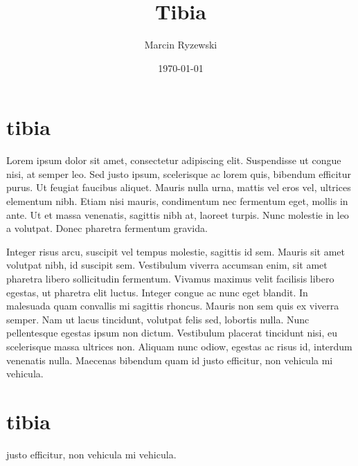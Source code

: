 \documentclass{article}
\begin{document}
\title{Tibia}
\author{Marcin Ryzewski}
\date{\today}
\maketitle  

\section{tibia}

Lorem ipsum dolor sit amet, consectetur adipiscing elit. 
Suspendisse ut congue nisi, at semper leo. Sed justo ipsum, 
scelerisque ac lorem quis, bibendum efficitur purus. 
Ut feugiat faucibus aliquet. Mauris nulla urna, mattis vel 
eros vel, ultrices elementum nibh. Etiam nisi mauris, 
condimentum nec fermentum eget, mollis in ante. Ut et 
massa venenatis, sagittis nibh at, laoreet turpis. Nunc molestie 
in leo a volutpat. Donec pharetra fermentum gravida.

Integer risus arcu, suscipit vel tempus molestie, 
sagittis id sem. Mauris sit amet volutpat nibh, id suscipit sem. 
Vestibulum viverra accumsan enim, sit amet pharetra libero 
sollicitudin fermentum. Vivamus maximus velit facilisis libero 
egestas, ut pharetra elit luctus. Integer congue ac nunc eget 
blandit. In malesuada quam convallis mi sagittis rhoncus. Mauris non 
sem quis ex viverra semper. Nam ut lacus tincidunt, volutpat felis sed, 
lobortis nulla. Nunc pellentesque egestas ipsum non dictum. Vestibulum 
placerat tincidunt nisi, eu scelerisque massa ultrices non. Aliquam nunc odiow,
egestas ac risus id, interdum venenatis nulla. Maecenas bibendum quam id 
justo efficitur, non vehicula mi vehicula.

\section{tibia}
justo efficitur, non vehicula mi vehicula.
\end{document}
